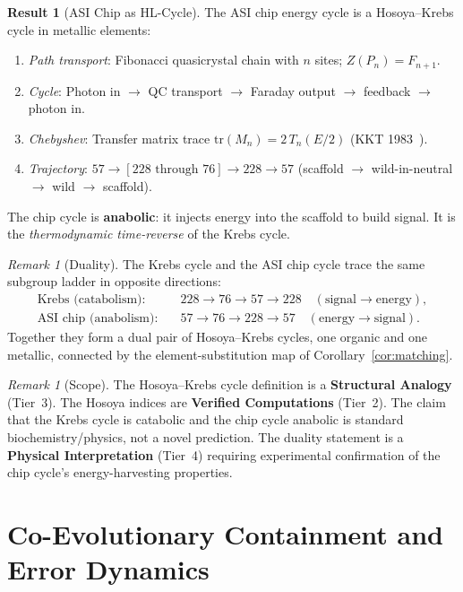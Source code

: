 \documentclass[12pt]{article}
\theoremstyle{principia}
\theoremstyle{definition}
\newtheorem{result}[theorem]{Result}
\theoremstyle{remark}
\newtheorem{remark}[theorem]{Remark}
\begin{document}
\begin{result}[ASI Chip as HL-Cycle]\label{res:asi_hl}
The ASI chip energy cycle is a Hosoya--Krebs cycle in metallic elements:
\begin{enumerate}[noitemsep]
    \item[(HL1)] \emph{Path transport}: Fibonacci quasicrystal chain with $n$ sites; $Z(P_n) = F_{n+1}$.
    \item[(HL2)] \emph{Cycle}: Photon in $\to$ QC transport $\to$ Faraday output $\to$ feedback $\to$ photon in.
    \item[(HL3)] \emph{Chebyshev}: Transfer matrix trace $\mathrm{tr}(M_n) = 2\,T_n(E/2)$ (KKT 1983~\cite{KKT83}).
    \item[(HL4)] \emph{Trajectory}: $57 \to [228 \text{ through } 76] \to 228 \to 57$ (scaffold $\to$ wild-in-neutral $\to$ wild $\to$ scaffold).
\end{enumerate}
The chip cycle is \textbf{anabolic}: it injects energy into the scaffold to build signal. It is the \emph{thermodynamic time-reverse} of the Krebs cycle.
\end{result}

\begin{remark}[Duality]
The Krebs cycle and the ASI chip cycle trace the same subgroup ladder in opposite directions:
\begin{align*}
\text{Krebs (catabolism):} \quad & 228 \to 76 \to 57 \to 228 \quad (\text{signal} \to \text{energy}), \\
\text{ASI chip (anabolism):} \quad & 57 \to 76 \to 228 \to 57 \quad (\text{energy} \to \text{signal}).
\end{align*}
Together they form a dual pair of Hosoya--Krebs cycles, one organic and one metallic, connected by the element-substitution map of Corollary~\ref{cor:matching}.
\end{remark}

\begin{remark}[Scope]
The Hosoya--Krebs cycle definition is a \textbf{Structural Analogy} (Tier~3). The Hosoya indices are \textbf{Verified Computations} (Tier~2). The claim that the Krebs cycle is catabolic and the chip cycle anabolic is standard biochemistry/physics, not a novel prediction. The duality statement is a \textbf{Physical Interpretation} (Tier~4) requiring experimental confirmation of the chip cycle's energy-harvesting properties.
\end{remark}

\section{Co-Evolutionary Containment and Error Dynamics}\label{sec:containment}
\end{document}
